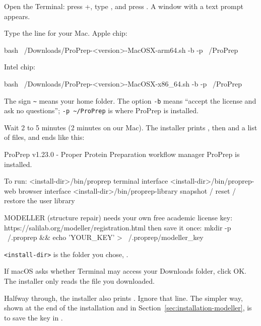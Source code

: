 \begin{steps}
  \item Open the Terminal: press +, type
        , and press . A window with a text prompt
        appears.
  \item Type the line for your Mac. Apple chip:
\begin{terminal}
bash ~/Downloads/ProPrep-<version>-MacOSX-arm64.sh -b -p ~/ProPrep
\end{terminal}
        Intel chip:
\begin{terminal}
bash ~/Downloads/ProPrep-<version>-MacOSX-x86_64.sh -b -p ~/ProPrep
\end{terminal}
        The sign \texttt{\textasciitilde} means your home folder. The option
        \texttt{-b} means ``accept the license and ask no questions'';
        \texttt{-p \textasciitilde/ProPrep} is where ProPrep is installed.
  \item Wait 2 to 5 minutes (2 minutes on our Mac). The installer prints
        , then  and a list of files, and ends like this:
\begin{screen}
ProPrep v1.23.0 - Proper Protein Preparation workflow manager
ProPrep is installed.

To run:
    <install-dir>/bin/proprep          terminal interface
    <install-dir>/bin/proprep-web      browser interface
    <install-dir>/bin/proprep-library  snapshot / reset / restore the user library

MODELLER (structure repair) needs your own free academic license key:
    https://salilab.org/modeller/registration.html
then save it once:
    mkdir -p ~/.proprep && echo 'YOUR_KEY' > ~/.proprep/modeller_key
\end{screen}
        \texttt{<install-dir>} is the folder you chose, .
  \item If macOS asks whether Terminal may access your Downloads folder,
        click \textsf{OK}. The installer only reads the file you downloaded.
\end{steps}

\begin{watchout}
Halfway through, the installer also prints .
Ignore that line. The simpler way, shown at the end of the installation and
in Section~\ref{sec:installation-modeller}, is to save the key in
.
\end{watchout}

